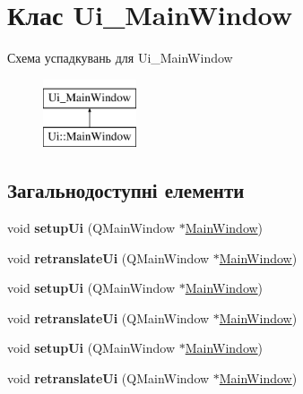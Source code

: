 \hypertarget{classUi__MainWindow}{\section{Клас Ui\-\_\-\-Main\-Window}
\label{classUi__MainWindow}
}
Схема успадкувань для Ui\-\_\-\-Main\-Window\begin{figure}[H]
\begin{center}
\leavevmode
\includegraphics[height=2.000000cm]{classUi__MainWindow}
\end{center}
\end{figure}
\subsection*{Загальнодоступні елементи}
\begin{DoxyCompactItemize}
\item 
\hypertarget{classUi__MainWindow_acf4a0872c4c77d8f43a2ec66ed849b58}{void {\bfseries setup\-Ui} (Q\-Main\-Window $\ast$\hyperlink{classMainWindow}{Main\-Window})}\label{classUi__MainWindow_acf4a0872c4c77d8f43a2ec66ed849b58}

\item 
\hypertarget{classUi__MainWindow_a097dd160c3534a204904cb374412c618}{void {\bfseries retranslate\-Ui} (Q\-Main\-Window $\ast$\hyperlink{classMainWindow}{Main\-Window})}\label{classUi__MainWindow_a097dd160c3534a204904cb374412c618}

\item 
\hypertarget{classUi__MainWindow_acf4a0872c4c77d8f43a2ec66ed849b58}{void {\bfseries setup\-Ui} (Q\-Main\-Window $\ast$\hyperlink{classMainWindow}{Main\-Window})}\label{classUi__MainWindow_acf4a0872c4c77d8f43a2ec66ed849b58}

\item 
\hypertarget{classUi__MainWindow_a097dd160c3534a204904cb374412c618}{void {\bfseries retranslate\-Ui} (Q\-Main\-Window $\ast$\hyperlink{classMainWindow}{Main\-Window})}\label{classUi__MainWindow_a097dd160c3534a204904cb374412c618}

\item 
\hypertarget{classUi__MainWindow_acf4a0872c4c77d8f43a2ec66ed849b58}{void {\bfseries setup\-Ui} (Q\-Main\-Window $\ast$\hyperlink{classMainWindow}{Main\-Window})}\label{classUi__MainWindow_acf4a0872c4c77d8f43a2ec66ed849b58}

\item 
\hypertarget{classUi__MainWindow_a097dd160c3534a204904cb374412c618}{void {\bfseries retranslate\-Ui} (Q\-Main\-Window $\ast$\hyperlink{classMainWindow}{Main\-Window})}\label{classUi__MainWindow_a097dd160c3534a204904cb374412c618}

\end{DoxyCompactItemize}
